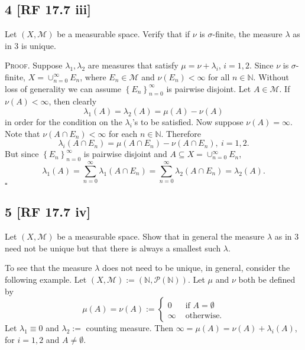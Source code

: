 \documentclass[12pt]{article}
\newcounter{ProofCounter}
\newenvironment{Proof}{\stepcounter{ProofCounter}\textsc{Proof.}}{\hfill$\square$}
\begin{document}
\subsection*{4 [RF 17.7 iii]}
\begin{tcolorbox}
Let $(X,\mathcal{M})$ be a measurable space. Verify that if $\nu$ is $\sigma$-finite, the measure $\lambda$ as in 3 is unique.
\end{tcolorbox}

\begin{Proof}
Suppose $\lambda_{1}, \lambda_{2}$ are measures that satisfy $\mu = \nu + \lambda_{i}$, $i = 1,2$. Since $\nu$ is $\sigma$-finite, $X =
\cup_{n=0}^{\infty}E_{n}$, where $E_{n} \in \mathcal{M}$ and $\nu(E_{n}) < \infty$ for all $n \in \mathbb{N}$. Without loss of generality we can assume $\left\{ E_{n}
\right\}_{n=0}^{\infty}$ is pairwise disjoint. Let $A \in \mathcal{M}$. If $\nu(A) < \infty$, then clearly 
\[ \lambda_{1}(A) = \lambda_{2}(A) = \mu(A) - \nu(A) \] 
in order for the condition on the $\lambda_{i}$'s to be satisfied. Now suppose $\nu(A) = \infty$. Note that $\nu(A\cap E_{n}) < \infty$ 
for each $n \in \mathbb{N}$. Therefore 
\[ \lambda_{i}(A\cap E_{n}) = \mu(A\cap E_{n}) - \nu(A\cap E_{n}), \ i = 1,2. \]
But since $\left\{ E_{n} \right\}_{n=0}^{\infty}$ is pairwise disjoint and $A \subseteq X = \cup_{n=0}^{\infty}E_{n}$,
\[ \lambda_{1}(A) = \sum_{n=0}^{\infty}\lambda_{1}(A\cap E_{n}) = \sum_{n=0}^{\infty}\lambda_{2}(A\cap E_{n}) = \lambda_{2}(A). \]
\end{Proof}



\newpage 
\subsection*{5 [RF 17.7 iv]}
\begin{tcolorbox}
Let $(X,\mathcal{M})$ be a measurable space. Show that in general the measure $\lambda$ as in 3 need not be unique but that there is always a smallest
such $\lambda$.
\end{tcolorbox}

To see that the measure $\lambda$ does not need to be unique, in general, consider
the following example. Let $(X,\mathcal{M}) := (\mathbb{N}, \mathcal{P}(\mathbb{N}))$.
Let $\mu$ and $\nu$ both be defined by 
\[ \mu(A) = \nu(A) := \left\{ \begin{array}{cl}
0 & \text{ if } A = \emptyset \\
\infty & \text{ otherwise.} \end{array} \right. \]
Let $\lambda_{1} \equiv 0$ and $\lambda_{2} :=$ counting measure. Then 
$\infty = \mu(A) = \nu(A) + \lambda_{i}(A)$, for $i = 1,2$ and $A \neq \emptyset$.
\end{document}
